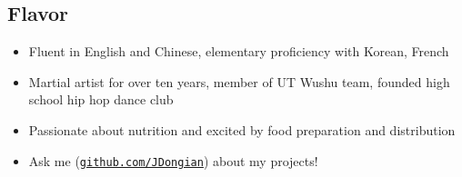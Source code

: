 \documentclass[line,margin]{res}
\begin{document}
\begin{resume}
\vspace{-8pt}
\section{Flavor} 
    \vspace{22pt}
        \begin{itemize} \itemsep -2pt
        \item Fluent in English and Chinese, elementary proficiency with Korean, French
        \item Martial artist for over ten years, member of UT Wushu team, founded high school hip hop dance club
        \item Passionate about nutrition and excited by food preparation and distribution
        \item Ask me (\href{https://www.github.com/JDongian}{\texttt{github.com/JDongian}}) about my projects! 
        \end{itemize}

\end{resume} 
\end{document}
